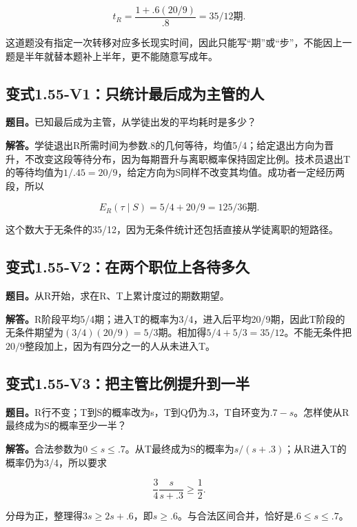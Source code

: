 \documentclass[
  11pt,
  a4paper,
  UTF8,
  fontset=fandol]{ctexart}
\begin{document}
\[
\boxed{t_R=\frac{1+.6(20/9)}{.8}=35/12\text{期}.}
\]

这道题没有指定一次转移对应多长现实时间，因此只能写``期''或``步''，不能因上一题是半年就替本题补上半年，更不能随意写成年。

\subsection{变式1.55-V1：只统计最后成为主管的人}\label{ux53d8ux5f0f1.55-v1ux53eaux7edfux8ba1ux6700ux540eux6210ux4e3aux4e3bux7ba1ux7684ux4eba}

\textbf{题目。}已知最后成为主管，从学徒出发的平均耗时是多少？

\textbf{解答。}学徒退出R所需时间为参数.8的几何等待，均值5/4；给定退出方向为晋升，不改变这段等待分布，因为每期晋升与离职概率保持固定比例。技术员退出T的等待均值为\(1/.45=20/9\)，给定方向为S同样不改变其均值。成功者一定经历两段，所以

\[
\boxed{E_R(\tau\mid S)=5/4+20/9=125/36\text{期}.}
\]

这个数大于无条件的35/12，因为无条件统计还包括直接从学徒离职的短路径。

\subsection{变式1.55-V2：在两个职位上各待多久}\label{ux53d8ux5f0f1.55-v2ux5728ux4e24ux4e2aux804cux4f4dux4e0aux5404ux5f85ux591aux4e45}

\textbf{题目。}从R开始，求在R、T上累计度过的期数期望。

\textbf{解答。}R阶段平均5/4期；进入T的概率为3/4，进入后平均20/9期，因此T阶段的无条件期望为\((3/4)(20/9)=5/3\)期。相加得\(5/4+5/3=35/12\)。不能无条件把\(20/9\)整段加上，因为有四分之一的人从未进入T。

\subsection{变式1.55-V3：把主管比例提升到一半}\label{ux53d8ux5f0f1.55-v3ux628aux4e3bux7ba1ux6bd4ux4f8bux63d0ux5347ux5230ux4e00ux534a}

\textbf{题目。}R行不变；T到S的概率改为s，T到Q仍为.3，T自环变为\(.7-s\)。怎样使从R最终成为S的概率至少一半？

\textbf{解答。}合法参数为\(0\le s\le.7\)。从T最终成为S的概率为\(s/(s+.3)\)；从R进入T的概率仍为3/4，所以要求

\[
\frac34\frac{s}{s+.3}\ge\frac12.
\]

分母为正，整理得\(3s\ge2s+.6\)，即\(\boxed{s\ge.6}\)。与合法区间合并，恰好是\(.6\le s\le.7\)。
\end{document}
